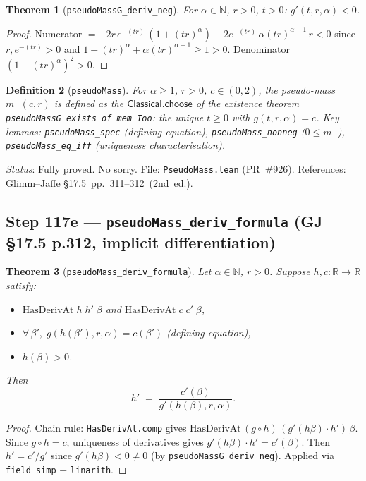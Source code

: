\documentclass[a4paper,11pt]{article}
\newtheorem{theorem}{Theorem}
\newtheorem{definition}[theorem]{Definition}
\begin{document}
\begin{theorem}[\texttt{pseudoMassG\_deriv\_neg}]
For $\alpha \in \mathbb{N}$, $r > 0$, $t > 0$: $g'(t,r,\alpha) < 0$.
\end{theorem}
\begin{proof}
Numerator $= -2r\,e^{-(tr)}\,(1+(tr)^\alpha) - 2e^{-(tr)}\,\alpha(tr)^{\alpha-1}\,r < 0$
since $r,e^{-(tr)}>0$ and $1+(tr)^\alpha+\alpha(tr)^{\alpha-1}\ge 1>0$.
Denominator $(1+(tr)^\alpha)^2>0$.
\end{proof}

\begin{definition}[\texttt{pseudoMass}]
For $\alpha \ge 1$, $r>0$, $c\in(0,2)$, the pseudo-mass $m^-(c,r)$ is defined as the
$\mathsf{Classical.choose}$ of the existence theorem \texttt{pseudoMassG\_exists\_of\_mem\_Ioo}:
the unique $t\ge 0$ with $g(t,r,\alpha)=c$.
Key lemmas: \texttt{pseudoMass\_spec} (defining equation), \texttt{pseudoMass\_nonneg}
($0 \le m^-$), \texttt{pseudoMass\_eq\_iff} (uniqueness characterisation).
\end{definition}

\noindent\textit{Status}: Fully proved. No sorry.
File: \texttt{PseudoMass.lean} (PR~\#926).
References: Glimm--Jaffe \S17.5~pp.~311--312~(2nd~ed.).

\subsection*{Step 117e — \texttt{pseudoMass\_deriv\_formula} (GJ \S17.5 p.312, implicit differentiation)}

\begin{theorem}[\texttt{pseudoMass\_deriv\_formula}]
Let $\alpha \in \mathbb{N}$, $r > 0$.
Suppose $h, c : \mathbb{R} \to \mathbb{R}$ satisfy:
\begin{itemize}
  \item $\mathrm{HasDerivAt}\;h\;h'\;\beta$ and $\mathrm{HasDerivAt}\;c\;c'\;\beta$,
  \item $\forall\,\beta',\; g(h(\beta'), r, \alpha) = c(\beta')$ (defining equation),
  \item $h(\beta) > 0$.
\end{itemize}
Then
\[
  h' \;=\; \frac{c'(\beta)}{g'(h(\beta), r, \alpha)}.
\]
\end{theorem}
\begin{proof}
Chain rule: \texttt{HasDerivAt.comp} gives $\mathrm{HasDerivAt}\,(g\circ h)\,(g'(h\beta)\cdot h')\,\beta$.
Since $g \circ h = c$, uniqueness of derivatives gives $g'(h\beta)\cdot h' = c'(\beta)$.
Then $h' = c'/g'$ since $g'(h\beta) < 0 \ne 0$ (by \texttt{pseudoMassG\_deriv\_neg}).
Applied via \texttt{field\_simp} + \texttt{linarith}.
\end{proof}
\end{document}
